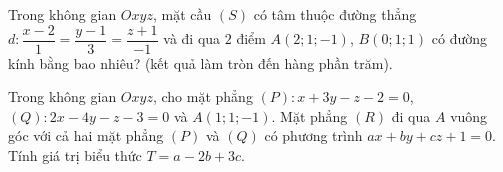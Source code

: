 \begin{ex}%
	Trong không gian $Oxyz$, mặt cầu $(S)$ có tâm thuộc đường thẳng $d\colon \dfrac{x-2}{1}=\dfrac{y-1}{3}=\dfrac{z+1}{-1}$ và đi qua $2$ điểm $A(2;1;-1)$, $B(0 ;1;1)$ có đường kính bằng bao nhiêu? (kết quả làm tròn đến hàng phần trăm).
	
\end{ex}
\begin{ex}%
	Trong không gian $Oxyz$, cho mặt phẳng $(P)\colon x+3y-z-2=0$,$(Q)\colon 2x-4 y-z-3=0$ và $A(1;1;-1)$. Mặt phẳng $(R)$ đi qua $A$ vuông góc với cả hai mặt phẳng $(P)$ và $(Q)$ có phương trình $ax+by+cz+1=0$. Tính giá trị biểu thức $T=a-2b+3c$.
	
\end{ex}

